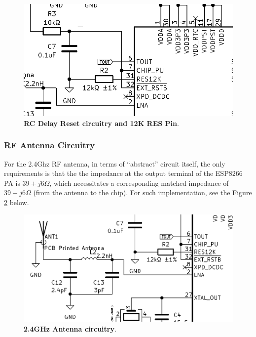 \begin{figure}[H]
    \centering
    \includegraphics[scale = 0.5]{imagens/RCDelayResetCircuitry.png}
    \caption{\textbf{RC Delay Reset circuitry and 12K RES Pin}.}
    \label{02fig:RCDelayResetCircuitry}
\end{figure}


\subsubsection{RF Antenna Circuitry}\label{02SubSub:RFAntennaCircuitry}

For the 2.4Ghz RF antenna, in terms of ``abstract'' circuit itself, the only requirements is that the
the impedance at the output terminal of the ESP8266 PA is $39 + j6 \Omega$, which necessitates a corresponding 
matched impedance of $39-j6 \Omega$ (from the antenna to the chip). For such implementation,
see the Figure \ref{02fig:RFAntennaCircuitry} below.




\begin{figure}[H]
    \centering
    \includegraphics[scale = 0.5]{imagens/RFAntennaCircuitry.png}
    \caption{\textbf{2.4GHz Antenna circuitry}.}
    \label{02fig:RFAntennaCircuitry}
\end{figure}


